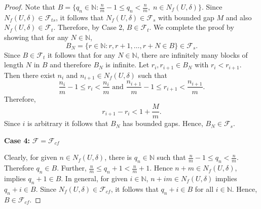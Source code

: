 \documentclass{amsart}[12pt, papera4]
\theoremstyle{definition}
\theoremstyle{remark}
\numberwithin{equation}{section}
\def\N{{\mathbb N}}
\def\F{{\mathscr{F}}}
\begin{document}
\begin{proof}
	\noindent Note that $B=\{q_n\in \mathbb{N}:\frac{n}{m}-1\leq q_n < \frac{n}{m},\; n\in N_f(U,\delta)\}.$ Since $N_f(U,\delta)\in \F_{ts}$, it follows that $N_f(U,\delta)\in \F_s$ with bounded gap $M$ and also $N_f(U,\delta)\in \F_t$. Therefore, by Case 2, $B\in \F_t$. We complete the proof by showing that for any $N\in \N$, $$B_N=\{r\in \mathbb{N}:r,r+1,\dots, r+N\in B\}\in \F_s.$$ Since $B\in \F_t$ it follows that for any $N\in \mathbb{N}$, there are infinitely many blocks of length $N$ in $B$ and therefore $B_N$ is infinite. Let $r_i,r_{i+1} \in B_N$ with $r_i<r_{i+1}$. Then there exist $n_i$ and $n_{i+1} \in N_f(U,\delta)$ such that $$\frac{n_i}{m}-1 \leq r_i < \frac{n_i}{m} \mbox{ and } \frac{n_{i+1}}{m}-1 \leq r_{i+1} < \frac{n_{i+1}}{m}.$$ Therefore, $$r_{i+1}-r_i<1+\frac{M}{m}.$$ Since $i$ is arbitrary it follows that $B_N$ has bounded gaps. Hence, $B_N\in \F_{s}$.
	
	
	\smallskip
	\noindent \textbf{Case 4:} $\F=\F_{cf}$
	
	\noindent Clearly, for given $n\in N_f(U,\delta)$, there is $q_n\in \N$ such that $\frac{\displaystyle{n}}{\displaystyle{m}}-1 \leq q_n < \frac{\displaystyle{n}}{\displaystyle{m}}$. Therefore $q_n\in B$. Further, $\frac{\displaystyle{n}}{\displaystyle{m}} \leq q_n+1 < \frac{\displaystyle{n}}{\displaystyle{m}}+1$. Hence $n+m\in N_f(U,\delta)$, implies $q_n+1\in B$. In general, for given $i\in \mathbb{N}$, $n+im\in N_f(U,\delta)$ implies $q_n+i\in B$. Since $N_f(U,\delta)\in \mathscr{F}_{cf}$, it follows that $q_n+i\in B$ for all $i\in \N$. Hence, $B\in \F_{cf}$.
\end{proof}
\end{document}
